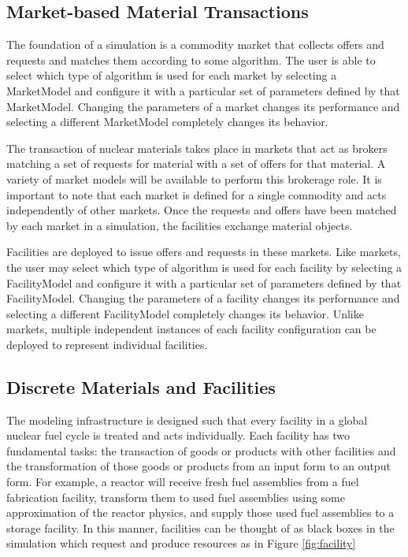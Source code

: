\subsection{Market-based Material Transactions}

The foundation of a simulation is a commodity market that collects 
offers and requests and matches them according to some algorithm.  The 
user is able to select which type of algorithm is used for each market 
by selecting a MarketModel and configure it with a particular set of 
parameters defined by that MarketModel.  Changing the parameters of a 
market changes its performance and selecting a different MarketModel 
completely changes its behavior.

The transaction of nuclear materials takes place in markets that act
as brokers matching a set of requests for material with a set of
offers for that material. A variety of market models will be available
to perform this brokerage role. It is important to note that each
market is defined for a single commodity and acts independently of
other markets. Once the requests and offers have been matched by each
market in a simulation, the facilities exchange material objects.

Facilities are deployed to issue offers and requests in these markets.  
Like markets, the user may select which type of algorithm is used for 
each facility by selecting a FacilityModel and configure it with a 
particular set of parameters defined by that FacilityModel.  Changing 
the parameters of a facility changes its performance and selecting a 
different FacilityModel completely changes its behavior.  Unlike 
markets, multiple independent instances of each facility configuration 
can be deployed to represent individual facilities.


\subsection{Discrete Materials and Facilities}

The \Cyclus modeling infrastructure is designed such that every
facility in a global nuclear fuel cycle is treated and acts
individually. Each facility has two fundamental tasks: the transaction of
goods or products with other facilities and the transformation of
those goods or products from an input form to an output form.  For
example, a reactor will receive fresh fuel assemblies from a fuel
fabrication facility, transform them to used fuel assemblies
using some approximation of the reactor physics, and supply those used
fuel assemblies to a storage facility. In this manner, facilities can be 
thought of as black boxes in the simulation which request and produce 
resources as in Figure \ref{fig:facility}

